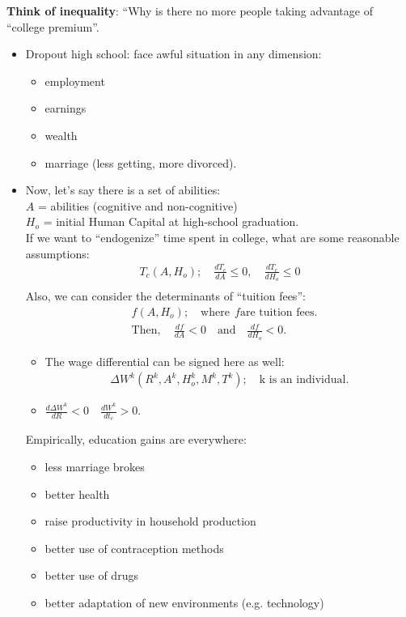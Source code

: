 \documentclass[14pt,notitlepage]{article}
\begin{document}
\textbf{Think of inequality}: ``Why is there no more people taking advantage of ``college premium''.
\begin{itemize}
\item Dropout high school: face awful situation in any dimension:
    \begin{itemize}
    \item employment
    \item earnings
    \item wealth
    \item marriage (less getting, more divorced).
    \end{itemize}
\item Now, let's say there is a set of abilities: \\
$A$ = abilities (cognitive and non-cognitive) \\
$H_o$ = initial Human Capital at high-school graduation. \\
If we want to ``endogenize'' time spent in college, what are some reasonable assumptions:
\begin{align*}
T_c (A, H_o); \quad \frac{dT_c}{dA} \leq 0, \quad \frac{dT_c}{dH_o} \leq 0 \\
\end{align*}
Also, we can consider the determinants of ``tuition fees'':
\begin{align*}
&f(A, H_o); \quad \text{where}\ \ f \text{are tuition fees}. \\
&\text{Then}, \quad \frac{df}{dA} < 0 \quad \text{and} \quad \frac{df}{dH_o} < 0.
\end{align*}
    \begin{itemize}
    \item The wage differential can be signed here as well:
    \begin{align*}
    \Delta W^{k} (R^{k}, A^{k}, H^{k}_o, M^{k}, T^{k}); \quad \text{k is an individual}.
    \end{align*}
    \item $\frac{d\Delta W^{k}}{dR} < 0 \quad \frac{dW^{k}}{dt_c} > 0$.
    \end{itemize}
Empirically, education gains are everywhere:
    \begin{itemize}
    \item less marriage brokes
    \item better health
    \item raise productivity in household production
    \item better use of contraception methods
    \item better use of drugs
    \item better adaptation of new environments (e.g. technology)
    \end{itemize}
\end{itemize}
\end{document}
